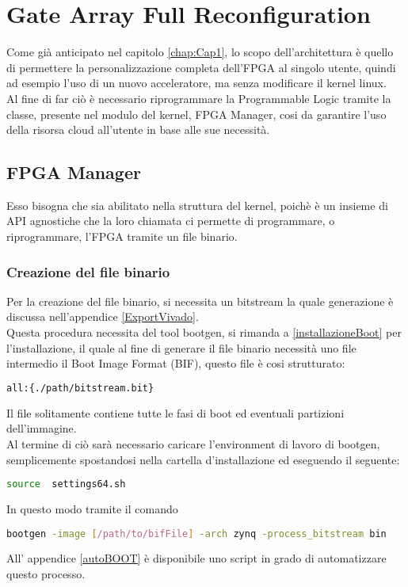 \chapter{Gate Array Full Reconfiguration}
\label{chap:Cap3}
Come già anticipato nel capitolo \ref{chap:Cap1}, lo scopo dell'architettura è quello di permettere la personalizzazione completa dell'FPGA al singolo utente, quindi ad esempio l'uso di un nuovo acceleratore, ma senza modificare il kernel linux.\\
Al fine di far ciò è necessario riprogrammare la Programmable Logic tramite la classe, presente nel modulo del kernel, FPGA Manager, cosi da garantire l'uso della risorsa cloud all'utente in base alle sue necessità.
\section{FPGA Manager}
Esso bisogna che sia abilitato nella struttura del kernel, poichè è un insieme di API agnostiche che la loro chiamata ci permette di programmare, o riprogrammare, l'FPGA tramite un file binario.
\subsection{Creazione del file binario}
Per la creazione del file binario, si necessita un bitstream la quale generazione è discussa nell'appendice \ref{ExportVivado}.\\
Questa procedura necessita del tool bootgen, si rimanda a \ref{installazioneBoot} per l'installazione, il quale al fine di generare il file binario necessità uno file intermedio il Boot Image Format (BIF), questo file è cosi strutturato:
\begin{lstlisting}[language=sh, label=lst:C, caption={template file .bif}]
all:{./path/bitstream.bit}
\end{lstlisting}
Il file solitamente contiene tutte le fasi di boot ed eventuali partizioni dell'immagine.\\
Al termine di ciò sarà necessario caricare l'environment di lavoro di bootgen, semplicemente spostandosi nella cartella d'installazione ed eseguendo il seguente:
\begin{lstlisting}[language=sh, label=lst:C, caption={setup environment bootgen}]
source  settings64.sh
\end{lstlisting}
In questo modo tramite il comando 
\begin{lstlisting}[language=sh, label=lst:C, caption={setup environment bootgen}]
bootgen -image [/path/to/bifFile] -arch zynq -process_bitstream bin
\end{lstlisting}
All' appendice \ref{autoBOOT} è disponibile uno script in grado di automatizzare questo processo.
